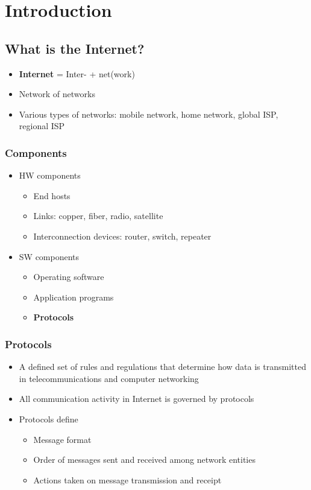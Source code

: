 \section{Introduction}
\subsection{What is the Internet?}
\begin{itemize}
	\item \textbf{Internet} = Inter- + net(work)
	\item Network of networks
	\item Various types of networks: mobile network, home network, global ISP, regional ISP
\end{itemize}

\subsubsection{Components}
\begin{itemize}
	\item HW components
	\begin{itemize}
		\item End hosts
		\item Links: copper, fiber, radio, satellite
		\item Interconnection devices: router, switch, repeater
	\end{itemize}
	\item SW components
	\begin{itemize}
		\item Operating software
		\item Application programs
		\item \textbf{Protocols}
	\end{itemize}
\end{itemize}

\subsubsection{Protocols}
\begin{itemize}
	\item A defined set of rules and regulations that determine how data is transmitted in telecommunications and computer networking
	\item All communication activity in Internet is governed by protocols
	\item Protocols define
	\begin{itemize}
		\item Message format
		\item Order of messages sent and received among network entities
		\item Actions taken on message transmission and receipt
	\end{itemize}
\end{itemize}

